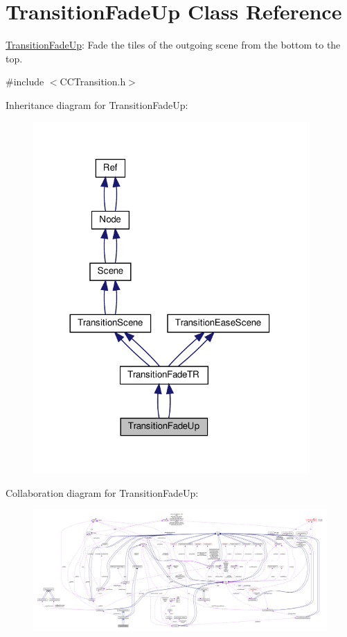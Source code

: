 \hypertarget{classTransitionFadeUp}{}\section{Transition\+Fade\+Up Class Reference}
\label{classTransitionFadeUp}


\hyperlink{classTransitionFadeUp}{Transition\+Fade\+Up}\+: Fade the tiles of the outgoing scene from the bottom to the top.  




{\ttfamily \#include $<$C\+C\+Transition.\+h$>$}



Inheritance diagram for Transition\+Fade\+Up\+:
\nopagebreak
\begin{figure}[H]
\begin{center}
\leavevmode
\includegraphics[width=296pt]{classTransitionFadeUp__inherit__graph}
\end{center}
\end{figure}


Collaboration diagram for Transition\+Fade\+Up\+:
\nopagebreak
\begin{figure}[H]
\begin{center}
\leavevmode
\includegraphics[width=350pt]{classTransitionFadeUp__coll__graph}
\end{center}
\end{figure}
